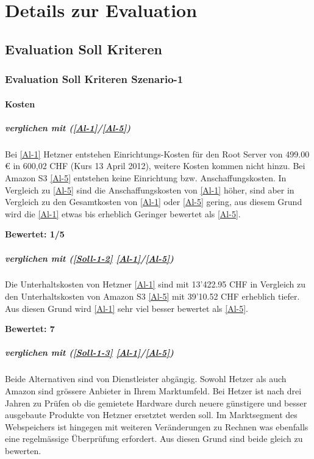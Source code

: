 \cleardoublepage
\chapter{Details zur Evaluation}
\section{Evaluation Soll Kriteren}
\subsection{Evaluation Soll Kriteren Szenario-1}

\subsubsection{Kosten}

\paragraph*{  verglichen mit  (\ref{Al-1}/\ref{Al-5})}
Bei \ref{Al-1} Hetzner entstehen Einrichtungs-Kosten für den Root Server von 499.00 € in 600,02 CHF (Kurs 13 April 2012), weitere Kosten kommen nicht hinzu. Bei Amazon S3 \ref{Al-5} entstehen keine Einrichtung bzw. Anschaffungskosten. In Vergleich zu \ref{Al-5} sind die Anschaffungskosten von \ref{Al-1} höher, sind aber in Vergleich zu den Gesamtkosten von \ref{Al-1} oder \ref{Al-5} gering, aus diesem Grund wird die \ref{Al-1} etwas bis erheblich Geringer bewertet als \ref{Al-5}.

\textbf{Bewertet: 1/5}

\paragraph*{  verglichen mit  (\ref{Soll-1-2} \ref{Al-1}/\ref{Al-5})}
Die Unterhaltskosten von Hetzner \ref{Al-1} sind mit 13'422.95 CHF in Vergleich zu den Unterhaltskosten von Amazon S3 \ref{Al-5} mit 39'10.52 CHF erheblich tiefer. Aus diesen Grund wird \ref{Al-1} sehr viel besser bewertet als \ref{Al-5}.

\textbf{Bewertet: 7}

\paragraph*{  verglichen mit  (\ref{Soll-1-3} \ref{Al-1}/\ref{Al-5})}
Beide Alternativen sind von Dienstleister abgängig. Sowohl Hetzer als auch Amazon sind grössere Anbieter in Ihrem Marktumfeld. Bei Hetzer ist nach drei Jahren zu Prüfen ob die gemietete Hardware durch neuere günstigere und besser ausgebaute Produkte von Hetzner ersetztet werden soll. Im Marktsegment des Webspeichers ist hingegen mit weiteren Veränderungen zu Rechnen was ebenfalls eine regelmässige Überprüfung erfordert. Aus diesen Grund sind beide gleich zu bewerten.

